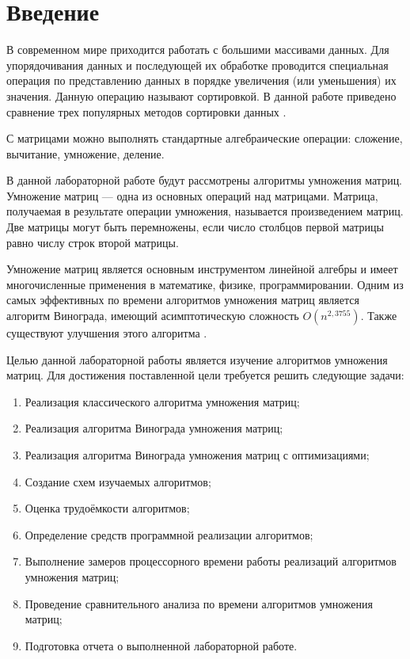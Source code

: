 \chapter*{Введение}

В современном мире приходится работать с большими
массивами данных. Для упорядочивания данных и последующей их
обработке проводится специальная операция по представлению
данных в порядке увеличения (или уменьшения) их значения. Данную
операцию называют сортировкой. В данной работе приведено
сравнение трех популярных методов сортировки данных \cite{winograd}.

С матрицами можно выполнять стандартные алгебраические операции: сложение, вычитание, умножение, деление.

В данной лабораторной работе будут рассмотрены алгоритмы умножения матриц.
Умножение матриц --- одна из основных операций над матрицами. Матрица, получаемая в результате операции умножения, называется произведением матриц.
Две матрицы могут быть перемножены, если число столбцов первой матрицы равно числу строк второй матрицы.

Умножение матриц является основным инструментом линейной алгебры и имеет многочисленные применения в математике, физике, программировании. Одним из самых эффективных по времени алгоритмов умножения матриц является алгоритм Винограда, имеющий асимптотическую сложность $O(n^{2,3755})$. Также существуют улучшения
этого алгоритма \cite{winograd}.

Целью данной лабораторной работы является изучение алгоритмов умножения матриц. Для достижения поставленной цели требуется решить следующие задачи:

\begin{enumerate}
	\item Реализация классического алгоритма умножения матриц;
	\item Реализация алгоритма Винограда умножения матриц;
	\item Реализация алгоритма Винограда умножения матриц с оптимизациями;
	\item Создание схем изучаемых алгоритмов;
	\item Оценка трудоёмкости алгоритмов;
	\item Определение средств программной реализации алгоритмов;
	\item Выполнение замеров процессорного времени работы реализаций алгоритмов умножения матриц;
	\item Проведение сравнительного анализа по времени алгоритмов умножения матриц;
	\item Подготовка отчета о выполненной лабораторной работе.
\end{enumerate}